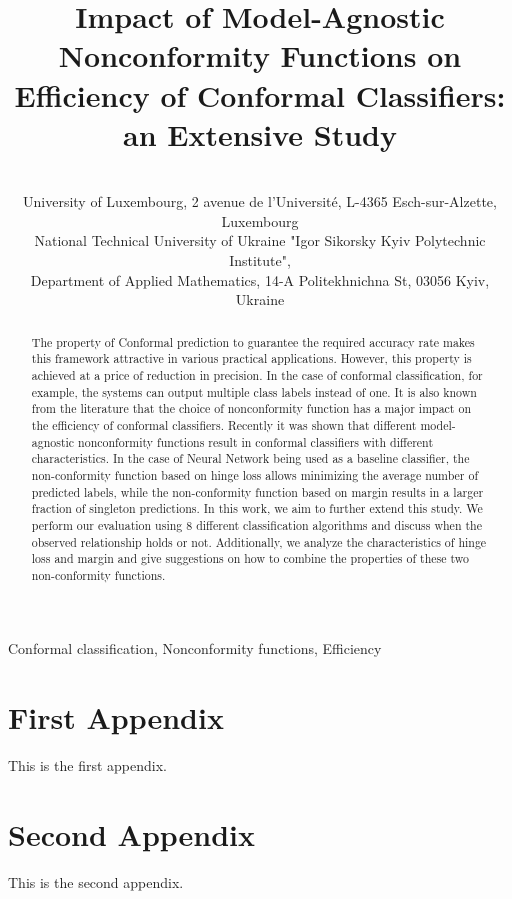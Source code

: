 \documentclass[tablecaption=bottom]{jmlr}%
\title[Impact of Nonconformity Functions on Efficiency of Conformal Classifiers]{
Impact of Model-Agnostic Nonconformity Functions on Efficiency of Conformal Classifiers: an Extensive Study
}
\author{\Name{Marharyta Aleksandrova} \Email{marharyta.aleksandrova@\{uni.lu,gmail.com\}}\\
  \addr University of Luxembourg, 2 avenue de l'Université, L-4365 Esch-sur-Alzette, Luxembourg
  \AND
  \Name{Oleg Chertov} \Email{chertov@i.ua}\\
  \addr National Technical University of Ukraine "Igor Sikorsky Kyiv Polytechnic Institute", \\
  Department of Applied Mathematics, 14-A Politekhnichna St, 03056 Kyiv, Ukraine
 }
\begin{document}
\maketitle

\begin{abstract}
The property of Conformal prediction to guarantee the required accuracy rate makes this framework attractive in various practical applications. However, this property is achieved at a price of reduction in precision. In the case of conformal classification, for example, the systems can output multiple class labels instead of one. It is also known from the literature that the choice of nonconformity function has a major impact on the efficiency of conformal classifiers. Recently it was shown that different model-agnostic nonconformity functions result in conformal classifiers with different characteristics. In the case of Neural Network being used as a baseline classifier, the non-conformity function based on hinge loss allows minimizing the average number of predicted labels, while the non-conformity function based on margin results in a larger fraction of singleton predictions. In this work, we aim to further extend this study. We perform our evaluation using 8 different classification algorithms and discuss when the observed relationship holds or not. Additionally, we analyze the characteristics of hinge loss and margin and give suggestions on how to combine the properties of these two non-conformity functions.
\end{abstract}
\begin{keywords}
Conformal classification,
Nonconformity functions,
Efficiency
\end{keywords}

%






\appendix

\section{First Appendix}\label{apd:first}

This is the first appendix.

\section{Second Appendix}\label{apd:second}

This is the second appendix.
\end{document}

